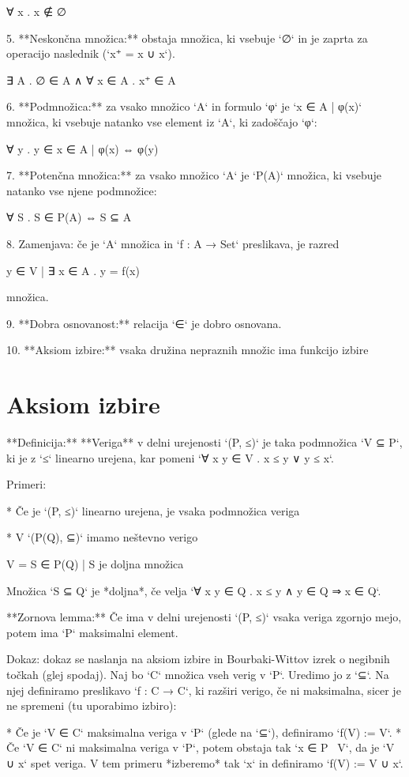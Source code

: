         ∀ x . x ∉ ∅

5. **Neskončna množica:** obstaja množica, ki vsebuje `∅` in je zaprta za operacijo naslednik
   (`x⁺ = x ∪ {x}`).

        ∃ A . ∅ ∈ A ∧ ∀ x ∈ A . x⁺ ∈ A

6. **Podmnožica:** za vsako množico `A` in formulo `φ` je `{x ∈ A | φ(x)}`
   množica, ki vsebuje natanko vse element iz `A`, ki zadoščajo `φ`:

        ∀ y . y ∈ {x ∈ A | φ(x)} ⇔ φ(y)

7. **Potenčna množica:** za vsako množico `A` je `P(A)` množica, ki vsebuje
   natanko vse njene podmnožice:

        ∀ S . S ∈ P(A) ⇔ S ⊆ A

8. Zamenjava: če je `A` množica in `f : A → Set` preslikava, je razred

        { y ∈ V | ∃ x ∈ A . y = f(x) }

   množica.

9. **Dobra osnovanost:** relacija `∈` je dobro osnovana.

10. **Aksiom izbire:** vsaka družina nepraznih množic ima funkcijo izbire


\section{Aksiom izbire}

**Definicija:** **Veriga** v delni urejenosti `(P, ≤)` je taka podmnožica `V ⊆
P`, ki je z `≤` linearno urejena, kar pomeni `∀ x y ∈ V . x ≤ y ∨ y ≤ x`.

Primeri:

* Če je `(P, ≤)` linearno urejena, je vsaka podmnožica veriga

* V `(P(Q), ⊆)` imamo neštevno verigo

        V = {S ∈ P(Q) | S je doljna množica}

  Množica `S ⊆ Q` je *doljna*, če velja `∀ x y ∈ Q . x ≤ y ∧ y ∈ Q ⇒ x ∈ Q`.

**Zornova lemma:** Če ima v delni urejenosti `(P, ≤)` vsaka veriga zgornjo mejo,
potem ima `P` maksimalni element.

Dokaz: dokaz se naslanja na aksiom izbire in Bourbaki-Wittov izrek o negibnih točkah (glej
spodaj). Naj bo `C` množica vseh verig v `P`. Uredimo jo z `⊆`. Na njej definiramo preslikavo
`f : C → C`, ki razširi verigo, če ni maksimalna, sicer je ne spremeni (tu uporabimo
izbiro):

* Če je `V ∈ C` maksimalna veriga v `P` (glede na `⊆`), definiramo `f(V) := V`.
* Če `V ∈ C` ni maksimalna veriga v `P`, potem obstaja tak `x ∈ P \ V`, da je `V
  ∪ {x}` spet veriga. V tem primeru *izberemo* tak `x` in definiramo `f(V) := V
  ∪ {x}`.

